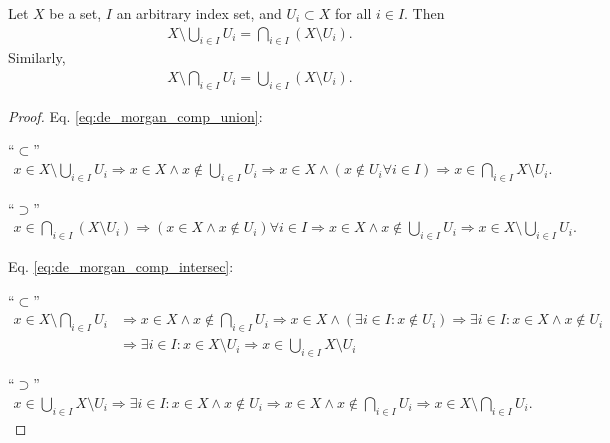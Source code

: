 \begin{theorem}\label{thrm:de_morgans_law}
	Let $X$ be a set, $I$ an arbitrary index set, and $U_i\subset X$ for all $i\in I$. Then 
	\begin{align}\label{eq:de_morgan_comp_union}
		X\setminus\bigcup_{i\in I}U_i = \bigcap_{i\in I}\left(X\setminus U_i\right).
	\end{align}
	Similarly, 
	\begin{align}\label{eq:de_morgan_comp_intersec}
		X\setminus \bigcap_{i\in I}U_i = \bigcup_{i\in I}\left(X\setminus U_i\right).
	\end{align}
\end{theorem}

\begin{proof}
	Eq. \eqref{eq:de_morgan_comp_union}: 
	
	\enquote{$\subset$} 
	\begin{align*}
		x\in X\setminus\bigcup_{i\in I}U_i\Rightarrow x\in X \wedge x\notin \bigcup_{i\in I}U_i\Rightarrow x\in X \wedge (x\notin U_i\forall i\in I)\Rightarrow x\in \bigcap_{i\in I}X\setminus U_i.
	\end{align*}

	\enquote{$\supset$}
	\begin{align*}
		x\in \bigcap_{i\in I}\left(X\setminus U_i\right) \Rightarrow \left(x\in X \wedge x\notin U_i\right) \forall i\in I\Rightarrow x\in X\wedge x\notin \bigcup_{i\in I}U_i\Rightarrow x\in X\setminus \bigcup_{i\in I}U_i.
	\end{align*}

	\noindent Eq. \eqref{eq:de_morgan_comp_intersec}:
	
	\enquote{$\subset$} 
	\begin{align*}
		x\in X\setminus \bigcap_{i\in I}U_i &\Rightarrow x\in X \wedge x\notin \bigcap_{i\in I}U_i \Rightarrow x\in X \wedge (\exists i\in I: x\notin U_i)\Rightarrow \exists i\in I: x\in X \wedge x\notin U_i \\ &\Rightarrow \exists i\in I: x\in X\setminus U_i\Rightarrow x\in \bigcup_{i\in I}X\setminus U_i
	\end{align*}

	\enquote{$\supset$}
	\begin{align*}
		x\in \bigcup_{i\in I}X\setminus U_i\Rightarrow \exists i\in I: x\in X\wedge x\notin U_i\Rightarrow x\in X\wedge x\notin \bigcap_{i\in I}U_i\Rightarrow x\in X\setminus \bigcap_{i\in I}U_i.
	\end{align*}
\end{proof}

